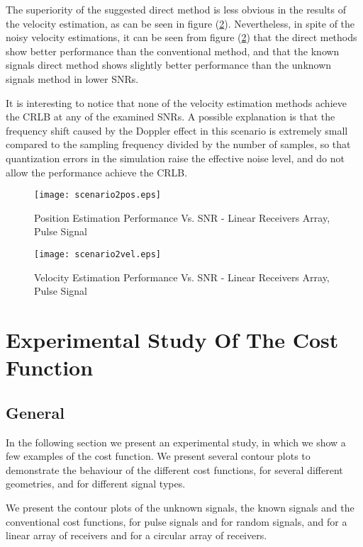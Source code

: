 The superiority of the suggested direct method is less obvious in the results of the velocity estimation, as can be seen in figure (\ref{fig:scenario2_vel_rms}). Nevertheless, in spite of the noisy velocity estimations, it can be seen from figure (\ref{fig:scenario2_vel_rms}) that the direct methods show better performance than the conventional method, and that the known signals direct method shows slightly better performance than the unknown signals method in lower SNRs.

It is interesting to notice that none of the velocity estimation methods achieve the CRLB at any of the examined SNRs. A possible explanation is that the frequency shift caused by the Doppler effect in this scenario is extremely small compared to the sampling frequency divided by the number of samples, so that quantization errors in the simulation raise the effective noise level, and do not allow the performance achieve the CRLB.

\begin{figure}
\begin{center}
\texttt{[image: scenario2pos.eps]} 
\end{center}
\caption{Position Estimation Performance Vs. SNR - Linear Receivers Array, Pulse Signal}
\label{fig:scenario2_pos_rms}
\end{figure}

\begin{figure}
\begin{center}
\texttt{[image: scenario2vel.eps]} 
\end{center}
\caption{Velocity Estimation Performance Vs. SNR - Linear Receivers Array, Pulse Signal}
\label{fig:scenario2_vel_rms}
\end{figure}

\section{Experimental Study Of The Cost Function}
\label{sec:experimental_study}
\subsection{General}
In the following section we present an experimental study, in which we show a few examples of the cost function. We present several contour plots to demonstrate the behaviour of the different cost functions, for several different geometries, and for different signal types.

We present the contour plots of the unknown signals, the known signals and the conventional cost functions, for pulse signals and for random signals, and for a linear array of receivers and for a circular array of receivers.

